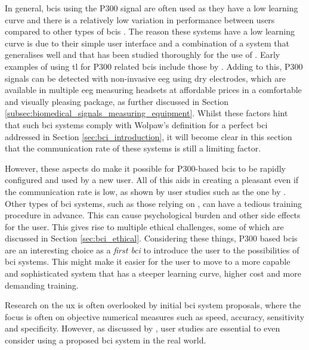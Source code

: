 In general, \glspl{bci} using the P300 signal are often used as they have a low learning curve and there is a relatively low variation in performance between users compared to other types of \glspl{bci} \citep{p300_spellers, p300_spellers_review}.
The reason these systems have a low learning curve is due to their simple user interface and a combination of a system that generalises well and that has been studied thoroughly for the use of .
Early examples of using \gls{tl} for P300 related \glspl{bci} include those by \citet{p300_speller_tl}.
Adding to this, P300 signals can be detected with non-invasive \gls{eeg} using dry electrodes, which are available in multiple \gls{eeg} measuring headsets at affordable prices in a comfortable and visually pleasing package, as further discussed in Section \ref{subsec:biomedical_signals_measuring_equipment}.
Whilst these factors hint that such \gls{bci} systems comply with Wolpaw's definition for a perfect \gls{bci} addressed in Section \ref{sec:bci_introduction}, it will become clear in this section that the communication rate of these systems is still a limiting factor.

However, these aspects do make it possible for P300-based \glspl{bci} to be rapidly configured and used by a new user.
All of this aids in creating a pleasant  even if the communication rate is low, as shown by user studies such as the one by \citet{p300_speller_real_life2}.
Other types of \gls{bci} systems, such as those relying on , can have a tedious training procedure in advance.
This can cause psychological burden and other side effects for the user.
This gives rise to multiple ethical challenges, some of which are discussed in Section \ref{sec:bci_ethical}.
Considering these things, P300 based \glspl{bci} are an interesting choice as a \textit{first \gls{bci}} to introduce the user to the possibilities of \gls{bci} systems.
This might make it easier for the user to move to a more capable and sophisticated system that has a steeper learning curve, higher cost and more demanding training.

Research on the \gls{ux} is often overlooked by initial \gls{bci} system proposals, where the focus is often on objective numerical measures such as speed, accuracy, sensitivity and specificity.
However, as discussed by \citet{thesis_arnau}, user studies are essential to even consider using a proposed \gls{bci} system in the real world.


